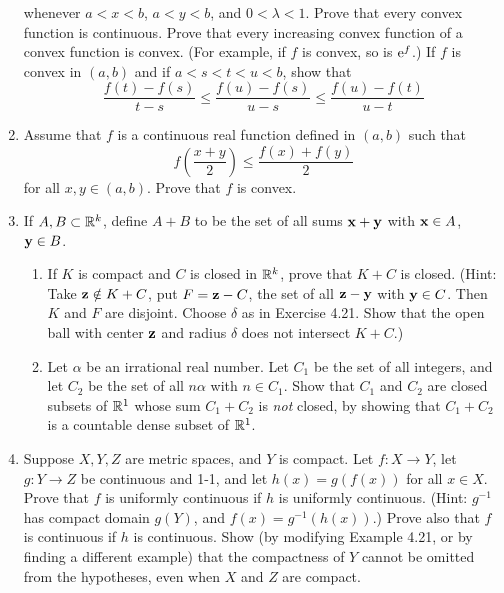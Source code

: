 \documentclass[../psets.tex]{subfiles}
\begin{document}
\begin{enumerate}[label={\textbf{\arabic*.}}]
\begin{equation*}
    \end{equation*}
    whenever $a<x<b$, $a<y<b$, and $0<\lambda<1$. Prove that every convex function is continuous. Prove that every increasing convex function of a convex function is convex. (For example, if $f$ is convex, so is $\e[f]$.) If $f$ is convex in $(a,b)$ and if $a<s<t<u<b$, show that
    \begin{equation*}
        \frac{f(t)-f(s)}{t-s} \leq \frac{f(u)-f(s)}{u-s} \leq \frac{f(u)-f(t)}{u-t}
    \end{equation*}
    \item Assume that $f$ is a continuous real function defined in $(a,b)$ such that
    \begin{equation*}
        f\left( \frac{x+y}{2} \right) \leq \frac{f(x)+f(y)}{2}
    \end{equation*}
    for all $x,y\in(a,b)$. Prove that $f$ is convex.
    \item If $A,B\subset\R^k$, define $A+B$ to be the set of all sums $\x+\y$ with $\x\in A$, $\y\in B$.
    \begin{enumerate}
        \item If $K$ is compact and $C$ is closed in $\R^k$, prove that $K+C$ is closed. (Hint: Take $\z\notin K+C$, put $F=\z-C$, the set of all $\z-\y$ with $\y\in C$. Then $K$ and $F$ are disjoint. Choose $\delta$ as in Exercise 4.21. Show that the open ball with center $\z$ and radius $\delta$ does not intersect $K+C$.)
        \item Let $\alpha$ be an irrational real number. Let $C_1$ be the set of all integers, and let $C_2$ be the set of all $n\alpha$ with $n\in C_1$. Show that $C_1$ and $C_2$ are closed subsets of $\R^1$ whose sum $C_1+C_2$ is \emph{not} closed, by showing that $C_1+C_2$ is a countable dense subset of $\R^1$.
    \end{enumerate}
    \item Suppose $X,Y,Z$ are metric spaces, and $Y$ is compact. Let $f:X\to Y$, let $g:Y\to Z$ be continuous and 1-1, and let $h(x)=g(f(x))$ for all $x\in X$. Prove that $f$ is uniformly continuous if $h$ is uniformly continuous. (Hint: $g^{-1}$ has compact domain $g(Y)$, and $f(x)=g^{-1}(h(x))$.) Prove also that $f$ is continuous if $h$ is continuous. Show (by modifying Example 4.21, or by finding a different example) that the compactness of $Y$ cannot be omitted from the hypotheses, even when $X$ and $Z$ are compact.
\end{enumerate}
\end{document}
